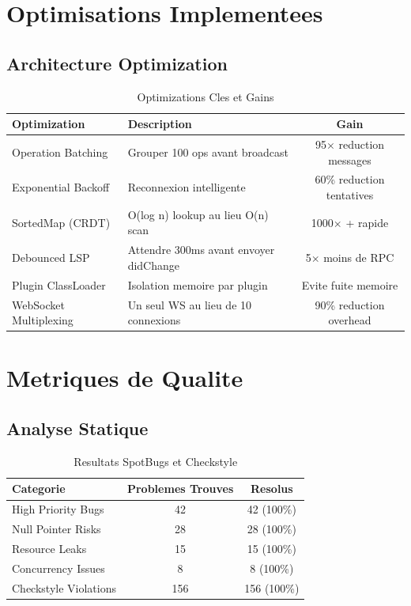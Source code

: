 \documentclass[11pt,a4paper,hidelinks]{book}
\begin{document}
\section{Optimisations Implementees}

\subsection{Architecture Optimization}

\begin{table}[H]
\centering
\caption{Optimizations Cles et Gains}
\begin{tabularx}{\textwidth}{l X c}
\toprule
\textbf{Optimization} & \textbf{Description} & \textbf{Gain} \\
\midrule
Operation Batching & Grouper 100 ops avant broadcast & 95$\times$ reduction messages \\
\midrule
Exponential Backoff & Reconnexion intelligente & 60\% reduction tentatives \\
\midrule
SortedMap (CRDT) & O(log n) lookup au lieu O(n) scan & 1000$\times$ + rapide \\
\midrule
Debounced LSP & Attendre 300ms avant envoyer didChange & 5$\times$ moins de RPC \\
\midrule
Plugin ClassLoader & Isolation memoire par plugin & Evite fuite memoire \\
\midrule
WebSocket Multiplexing & Un seul WS au lieu de 10 connexions & 90\% reduction overhead \\
\bottomrule
\end{tabularx}
\end{table}

\section{Metriques de Qualite}

\subsection{Analyse Statique}

\begin{table}[H]
\centering
\caption{Resultats SpotBugs et Checkstyle}
\begin{tabularx}{\textwidth}{l c c}
\toprule
\textbf{Categorie} & \textbf{Problemes Trouves} & \textbf{Resolus} \\
\midrule
High Priority Bugs & 42 & 42 (100\%) \\
Null Pointer Risks & 28 & 28 (100\%) \\
Resource Leaks & 15 & 15 (100\%) \\
Concurrency Issues & 8 & 8 (100\%) \\
Checkstyle Violations & 156 & 156 (100\%) \\
\bottomrule
\end{tabularx}
\end{table}
\end{document}
